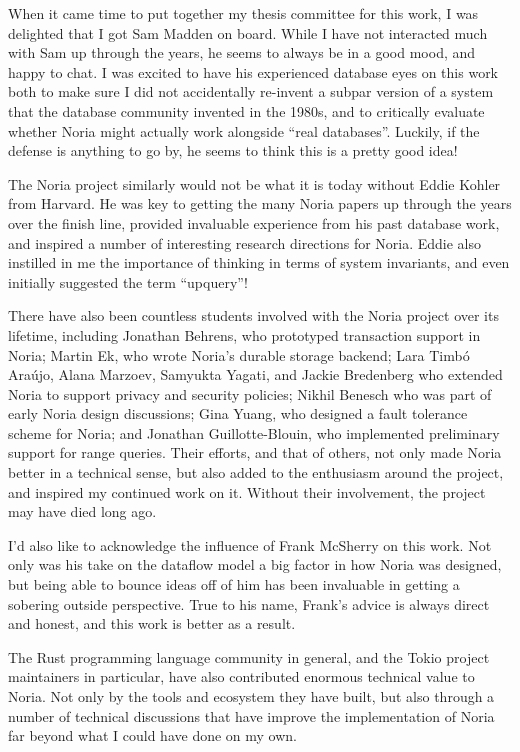 When it came time to put together my thesis committee for this work, I was
delighted that I got Sam Madden on board. While I have not interacted much with
Sam up through the years, he seems to always be in a good mood, and happy to
chat. I was excited to have his experienced database eyes on this work both to
make sure I did not accidentally re-invent a subpar version of a system that the
database community invented in the 1980s, and to critically evaluate whether
Noria might actually work alongside ``real databases''. Luckily, if the defense
is anything to go by, he seems to think this is a pretty good idea!

The Noria project similarly would not be what it is today without Eddie Kohler
from Harvard. He was key to getting the many Noria papers up through the years
over the finish line, provided invaluable experience from his past database
work, and inspired a number of interesting research directions for Noria. Eddie
also instilled in me the importance of thinking in terms of system invariants,
and even initially suggested the term ``upquery''!

There have also been countless students involved with the Noria project over its
lifetime, including Jonathan Behrens, who prototyped transaction support in
Noria; Martin Ek, who wrote Noria's durable storage backend; Lara Timb\'{o}
Ara\'{u}jo, Alana Marzoev, Samyukta Yagati, and Jackie Bredenberg who extended
Noria to support privacy and security policies; Nikhil Benesch who was part of
early Noria design discussions; Gina Yuang, who designed a fault tolerance
scheme for Noria; and Jonathan Guillotte-Blouin, who implemented preliminary
support for range queries. Their efforts, and that of others, not only made
Noria better in a technical sense, but also added to the enthusiasm around the
project, and inspired my continued work on it. Without their involvement, the
project may have died long ago.

I'd also like to acknowledge the influence of Frank McSherry on this work. Not
only was his take on the dataflow model a big factor in how Noria was designed,
but being able to bounce ideas off of him has been invaluable in getting a
sobering outside perspective. True to his name, Frank's advice is always direct
and honest, and this work is better as a result.

The Rust programming language community in general, and the Tokio project
maintainers in particular, have also contributed enormous technical value to
Noria. Not only by the tools and ecosystem they have built, but also through a
number of technical discussions that have improve the implementation of Noria
far beyond what I could have done on my own.


